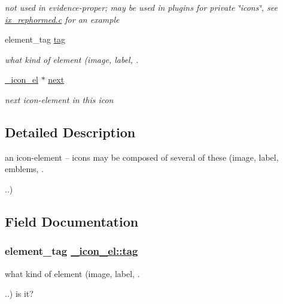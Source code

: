 \begin{CompactItemize}
\begin{CompactList}\small\item\em not used in evidence-proper; may be used in plugins for private \char`\"{}icons\char`\"{}, see \hyperlink{ix__rephormed_8c}{ix\_\-rephormed.c} for an example \item\end{CompactList}\item 
element\_\-tag \hyperlink{struct__icon__el_o7}{tag}
\begin{CompactList}\small\item\em what kind of element (image, label, . \item\end{CompactList}\item 
\hypertarget{struct__icon__el_o8}{
\hyperlink{struct__icon__el}{\_\-icon\_\-el} $\ast$ \hyperlink{struct__icon__el_o8}{next}}
\label{struct__icon__el_o8}

\begin{CompactList}\small\item\em next icon-element in this icon \item\end{CompactList}\end{CompactItemize}


\subsection{Detailed Description}
an icon-element -- icons may be composed of several of these (image, label, emblems, . 

..) 



\subsection{Field Documentation}
\hypertarget{struct__icon__el_o7}{
\subsubsection[tag]{\setlength{\rightskip}{0pt plus 5cm}element\_\-tag \hyperlink{struct__icon__el_o7}{\_\-icon\_\-el::tag}}}
\label{struct__icon__el_o7}


what kind of element (image, label, . 

..) is it? 